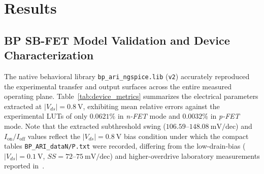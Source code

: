 \section{Results}\label{sec:results}

\subsection{BP SB-FET Model Validation and Device Characterization}\label{sec:res_model}

The native behavioral library \texttt{bp\_ari\_ngspice.lib} (\texttt{v2}) accurately reproduced the experimental transfer and output surfaces across the entire measured operating plane. Table~\ref{tab:device_metrics} summarizes the electrical parameters extracted at $|V_{ds}| = 0.8\ \text{V}$, exhibiting mean relative errors against the experimental LUTs of only $0.0621\%$ in \textit{n-FET} mode and $0.0032\%$ in \textit{p-FET} mode. Note that the extracted subthreshold swing ($106.59\text{--}148.08\ \text{mV/dec}$) and $I_{\mathrm{on}}/I_{\mathrm{off}}$ values reflect the $|V_{ds}| = 0.8\ \text{V}$ bias condition under which the compact tables \texttt{BP\_ARI\_dataN/P.txt} were recorded, differing from the low-drain-bias ($|V_{ds}| = 0.1\ \text{V}$, $SS = 72\text{--}75\ \text{mV/dec}$) and higher-overdrive laboratory measurements reported in~\cite{wu2020reconfigurable}.

\begin{table}[htbp]
\centering
\caption{Electrical metrics of the BP SB-FET device extracted in \texttt{ngspice-47} ($|V_{ds}|=0.8\ \text{V}$).}
\label{tab:device_metrics}
\end{table}

